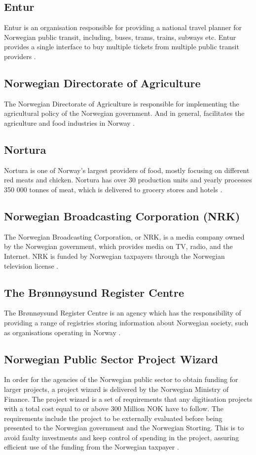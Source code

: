 \subsection{Entur}
Entur is an organisation responsible for providing a national travel planner for Norwegian public transit, including, buses, trams, trains, subways etc. Entur provides a single interface to buy multiple tickets from multiple public transit providers \cite{entur_2023}.

\subsection{Norwegian Directorate of Agriculture}
The Norwegian Directorate of Agriculture is responsible for implementing the agricultural policy of the Norwegian government. And in general, facilitates the agriculture and food industries in Norway \cite{landbruksdirektoratet_2023}.

\subsection{Nortura}
Nortura is one of Norway's largest providers of food, mostly focusing on different red meats and chicken. Nortura has over 30 production units and yearly processes 350 000 tonnes of meat, which is delivered to grocery stores and hotels \cite{nortura_2023}.

\subsection{Norwegian Broadcasting Corporation (NRK)}
The Norwegian Broadcasting Corporation, or NRK, is a media company owned by the Norwegian government, which provides media on TV, radio, and the Internet. NRK is funded by Norwegian taxpayers through the Norwegian television license \cite{nrk_wiki_2023}.

\subsection{The Brønnøysund Register Centre}
The Brønnøysund Register Centre is an agency which has the responsibility of providing a range of registries storing information about Norwegian society, such as organisations operating in Norway \cite{brønnøysundregistrene_wiki_2023}.

\subsection{Norwegian Public Sector Project Wizard} \label{sec:project_wizard_case_bg}
In order for the agencies of the Norwegian public sector to obtain funding for larger projects, a project wizard is delivered by the Norwegian Ministry of Finance. The project wizard is a set of requirements that any digitisation projects with a total cost equal to or above 300 Million NOK have to follow. The requirements include the project to be externally evaluated before being presented to the Norwegian government and the Norwegian Storting. This is to avoid faulty investments and keep control of spending in the project, assuring efficient use of the funding from the Norwegian taxpayer \cite{project_wizard_r_2019}.

